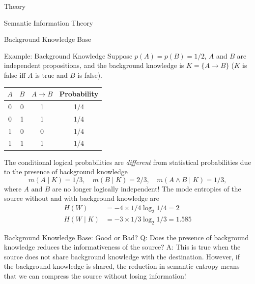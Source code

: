 \documentclass[presentation,mathserif,9pt]{beamer}
\begin{document}
\begin{section}{Theory}
\begin{subsection}{Semantic Information Theory}
		\begin{frame}{Background Knowledge Base}
			\begin{exampleblock}{Example: Background Knowledge}
				Suppose $p(A)=p(B)=1/2$, $A$ and $B$ are independent propositions, and the background knowledge is $K=\{A \to B\}$ ($K$ is false iff $A$ is true and $B$ is false).
				\begin{table}[]
					\begin{tabular}{|c|c|c|c|}
						\hline
						$A$ & $B$ & {\color{blue} $A \to B$} & Probability \\ \hline
						0   & 0   & {\color{blue} 1}         & 1/4         \\ \hline
						0   & 1   & {\color{blue} 1}         & 1/4         \\ \hline
						1   & 0   & {\color{blue} 0}         & 1/4         \\ \hline
						1   & 1   & {\color{blue} 1}         & 1/4         \\ \hline
					\end{tabular}
				\end{table}
				The conditional logical probabilities are \emph{different} from statistical probabilities due to the presence of background knowledge
				\begin{equation*}
					m(A \mid K) = 1/3, \quad m(B \mid K) = 2/3, \quad m(A \wedge B \mid K) = 1/3,
				\end{equation*}
				where $A$ and $B$ are no longer logically independent!
				The mode entropies of the source without and with background knowledge are
				\begin{align*}
					H(W)        & = -4 \times 1/4 \log_2 1/4 = 2     \\
					H(W \mid K) & = -3 \times 1/3 \log_2 1/3 = 1.585
				\end{align*}
			\end{exampleblock}
		\end{frame}

		\begin{frame}{Background Knowledge Base: Good or Bad?}
			Q: Does the presence of background knowledge {\color{gray} reduces} the informativeness of the source?
			\singlespacing
			A: This is true when the source {\color{gray} does not share} background knowledge with the destination. However, if the background knowledge is {\color{blue} shared}, the reduction in semantic entropy means that we can {\color{blue} compress} the source without losing information!
		\end{frame}


\end{subsection}
\end{section}
\end{document}
